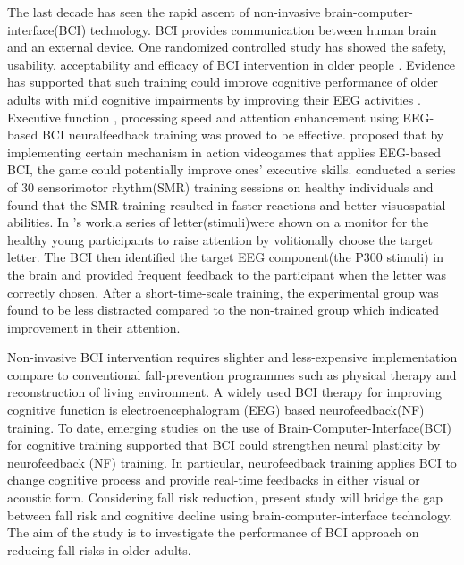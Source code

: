 \documentclass{article}
\begin{document}
The last decade has seen the rapid ascent of non-invasive brain-computer-interface(BCI) technology. BCI provides communication between human brain and an external device. One randomized controlled study has showed the safety, usability, acceptability and efficacy of BCI intervention in older people \cite{Lee_2013}. Evidence has supported that such training could improve cognitive performance of older adults with mild cognitive impairments by improving their EEG activities \cite{Marlats_2020}. Executive function \cite{Mond_jar_2016}, processing speed \cite{Doppelmayr_2011} and attention \cite{Arvaneh_2019} enhancement using EEG-based BCI neuralfeedback training was proved to be effective. \citeauthor{Mond_jar_2016} proposed  that by implementing certain mechanism in action videogames that applies EEG-based BCI, the game could potentially improve ones' executive skills. \citeauthor{Doppelmayr_2011} conducted a series of 30 sensorimotor rhythm(SMR) training sessions on healthy individuals and found that the SMR training resulted in faster reactions and better visuospatial abilities. In \citeauthor{Arvaneh_2019}'s work,a series of letter(stimuli)were shown on a monitor for the healthy young participants to raise attention by volitionally choose the target letter. The BCI then identified the target EEG component(the P300 stimuli) in the brain and provided frequent feedback to the participant when the letter was correctly chosen. After a short-time-scale training, the experimental group was found to be less distracted compared to the non-trained group which indicated improvement in their attention. 

Non-invasive BCI intervention requires slighter and less-expensive implementation compare to conventional fall-prevention programmes such as physical therapy and reconstruction of living environment. A widely used BCI therapy for improving cognitive function is electroencephalogram (EEG) based neurofeedback(NF) training. To date, emerging studies on the use of Brain-Computer-Interface(BCI) for cognitive training supported that BCI could strengthen neural plasticity by neurofeedback (NF) training. In particular, neurofeedback training applies BCI to change cognitive process and provide real-time feedbacks in either visual or acoustic form. Considering fall risk reduction, present study will bridge the gap between fall risk and cognitive decline using brain-computer-interface technology. The aim of the study is to investigate the performance of BCI approach on reducing fall risks in older adults.
\end{document}
